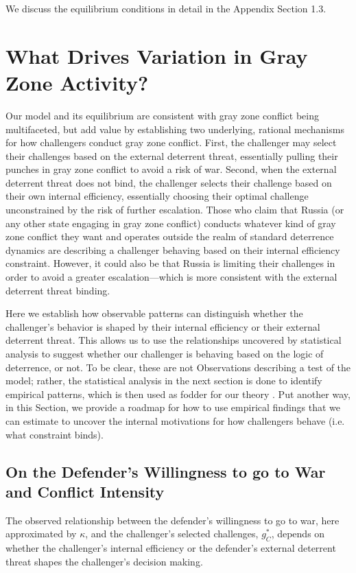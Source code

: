 \documentclass[11pt,letterpaper,pdftex,dvipsnames,table]{article}
\begin{document}
We discuss the equilibrium conditions in detail in the Appendix Section 1.3.

\section{What Drives Variation in Gray Zone Activity?} \label{useme}

Our model and its equilibrium are consistent with gray zone conflict being multifaceted, but add value by establishing two underlying, rational mechanisms for how challengers conduct gray zone conflict. First, the challenger may select their challenges based on the external deterrent threat, essentially pulling their punches in gray zone conflict to avoid a risk of war. Second, when the external deterrent threat does not bind, the challenger selects their challenge based on their own internal efficiency, essentially choosing their optimal challenge unconstrained by the risk of further escalation. Those who claim that Russia (or any other state engaging in gray zone conflict) conducts whatever kind of gray zone conflict they want and operates outside the realm of standard deterrence dynamics are describing a challenger behaving based on their internal efficiency constraint. However, it could also be that Russia is limiting their challenges in order to avoid a greater escalation---which is more consistent with the external deterrent threat binding.

Here we establish how observable patterns can distinguish whether the challenger's behavior is shaped by their internal efficiency or their external deterrent threat. This allows us to use the relationships uncovered by statistical analysis to suggest whether our challenger is behaving based on the logic of deterrence, or not. To be clear, these are not Observations describing a test of the model; rather, the statistical analysis in the next section is done to identify empirical patterns, which is then used as fodder for our theory \citep{hoover_methodologyeconometrics_2006, clarke_modeldisciplinepolitical_2012}. 
Put another way, in this Section,  we provide a roadmap for how to use empirical findings that we can estimate to uncover the internal motivations for how challengers behave (i.e. what constraint binds).

\subsection{On the Defender's Willingness to go to War and Conflict Intensity}
The observed relationship between the defender's willingness to go to war, here approximated by $\kappa$, and the challenger's selected challenges, $g_{C}^{*}$, depends on whether the challenger's internal efficiency or the defender's external deterrent threat shapes the challenger's decision making.
\end{document}
